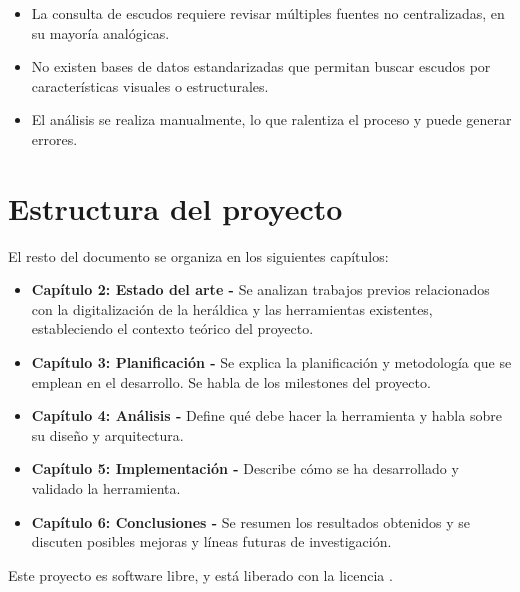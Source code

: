 \begin{itemize}
    \item La consulta de escudos requiere revisar múltiples fuentes no centralizadas, 
    en su mayoría analógicas.
    \item No existen bases de datos estandarizadas que permitan buscar escudos por
    características visuales o estructurales.
    \item El análisis se realiza manualmente, lo que ralentiza el proceso y puede
    generar errores.
\end{itemize}

\section{Estructura del proyecto}
El resto del documento se organiza en los siguientes capítulos:

\begin{itemize}
    \item \textbf{Capítulo 2: Estado del arte - }Se analizan trabajos previos relacionados
    con la digitalización de la heráldica y las herramientas existentes, estableciendo
    el contexto teórico del proyecto.
    \item \textbf{Capítulo 3: Planificación - }Se explica la planificación y metodología
    que se emplean en el desarrollo. Se habla de los milestones del proyecto.
    \item \textbf{Capítulo 4: Análisis - }Define qué debe hacer la herramienta y habla
    sobre su diseño y arquitectura.
    \item \textbf{Capítulo 5: Implementación - }Describe cómo se ha desarrollado y validado
    la herramienta. 
    \item \textbf{Capítulo 6: Conclusiones - }Se resumen los resultados obtenidos y se
    discuten posibles mejoras y líneas futuras de investigación.
\end{itemize}

Este proyecto es software libre, y está liberado con la licencia \cite{gplv3}.